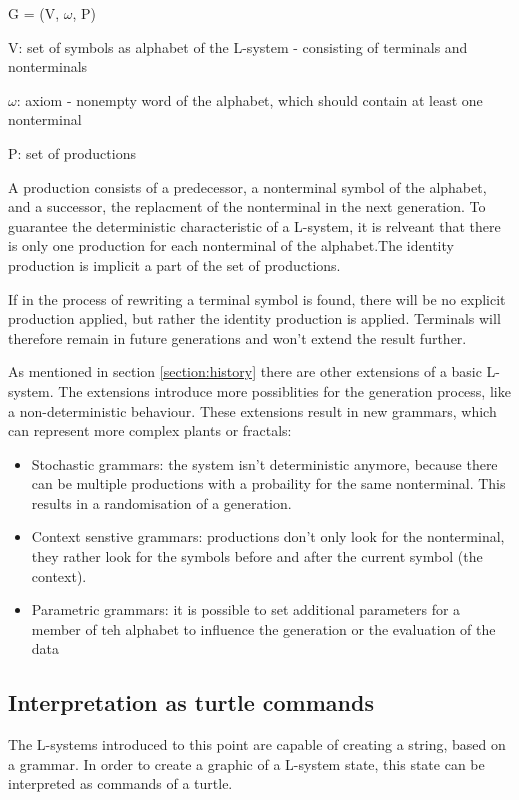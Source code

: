 \documentclass[english]{cpp-hmwk}
\begin{document}
\begin{center}
G = (V, $\omega$, P)
\end{center}

V: set of symbols as alphabet of the L-system - consisting of terminals and nonterminals

$\omega$: axiom - nonempty word of the alphabet, which should contain at least one nonterminal

P: set of productions

\medskip
\noindent A production consists of a predecessor, a nonterminal symbol of the alphabet, and a successor, the replacment of the nonterminal in the next generation.
To guarantee the deterministic characteristic of a L-system, it is relveant that there is only one production for each nonterminal of the alphabet.The identity production is implicit a part of the set of productions.\cite[Cf. Chapter 1.2, p.~4f.]{prusinkiewiczp.lindenmayera.2004}

\medskip

If in the process of rewriting a terminal symbol is found, there will be no explicit production applied, but rather the identity production is applied. Terminals will therefore remain in future generations and won't extend the result further.

\medskip

\noindent As mentioned in section \ref{section:history} there are other extensions of a basic L-system. The extensions introduce more possiblities for the generation process, like a non-deterministic behaviour. These extensions result in new grammars, which can represent more complex plants or fractals:

\begin{itemize}
\item Stochastic grammars: the system isn't deterministic anymore, because there can be multiple productions with a probaility for the same nonterminal. This results in a randomisation of a generation.
\item Context senstive grammars: productions don't only look for the nonterminal, they rather look for the symbols before and after the current symbol (the context).
\item Parametric grammars: it is possible to set additional parameters for a member of teh alphabet to influence the generation or the evaluation of the data
\end{itemize}

\subsection{Interpretation as turtle commands}
\label{section:turtle}
The L-systems introduced to this point are capable of creating a string, based on a grammar. In order to create a graphic of a L-system state, this state can be interpreted as commands of a turtle.
\end{document}
